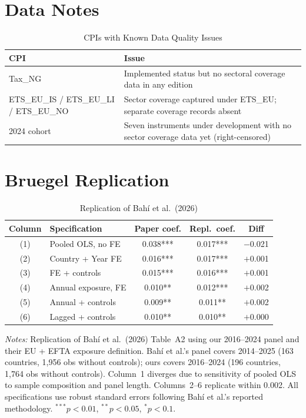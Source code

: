 \documentclass[12pt,a4paper]{article}
\begin{document}
\section{Data Notes}\label{app:data_notes}

\begin{table}[H]
\centering
\caption{CPIs with Known Data Quality Issues}
\label{tab:data_notes}
\begin{tabular}{lp{10cm}}
\toprule
CPI & Issue \\
\midrule
Tax\_NG & Implemented status but no sectoral coverage data in any edition \\
ETS\_EU\_IS / ETS\_EU\_LI / ETS\_EU\_NO & Sector coverage captured under ETS\_EU; separate coverage records absent \\
2024 cohort & Seven instruments under development with no sector coverage data yet (right-censored) \\
\bottomrule
\end{tabular}
\end{table}


\section{Bruegel Replication}\label{app:bruegel_replication}

\begin{table}[H]
\centering
\caption{Replication of Bahí et al.\ (2026)}
\label{tab:bruegel_replication}
\begin{tabular}{clccc}
\toprule
Column & Specification & Paper coef. & Repl.\ coef. & Diff \\
\midrule
(1) & Pooled OLS, no FE       & 0.038*** & 0.017*** & $-$0.021 \\
(2) & Country + Year FE       & 0.016*** & 0.017*** & $+$0.001 \\
(3) & FE + controls           & 0.015*** & 0.016*** & $+$0.001 \\
(4) & Annual exposure, FE     & 0.010**  & 0.012*** & $+$0.002 \\
(5) & Annual + controls       & 0.009**  & 0.011**  & $+$0.002 \\
(6) & Lagged + controls       & 0.010**  & 0.010**  & $+$0.000 \\
\bottomrule
\end{tabular}
\begin{minipage}{0.92\textwidth}
\vspace{0.3em}
\footnotesize
\textit{Notes:} Replication of Bahí et al.\ (2026) Table~A2 using our 2016--2024 panel and their EU + EFTA exposure definition. Bahí et al.'s panel covers 2014--2025 (163 countries, 1,956 obs without controls); ours covers 2016--2024 (196 countries, 1,764 obs without controls). Column~1 diverges due to sensitivity of pooled OLS to sample composition and panel length. Columns~2--6 replicate within 0.002. All specifications use robust standard errors following Bahí et al.'s reported methodology. $^{***}p<0.01$, $^{**}p<0.05$, $^{*}p<0.1$.
\end{minipage}
\end{table}
\end{document}
